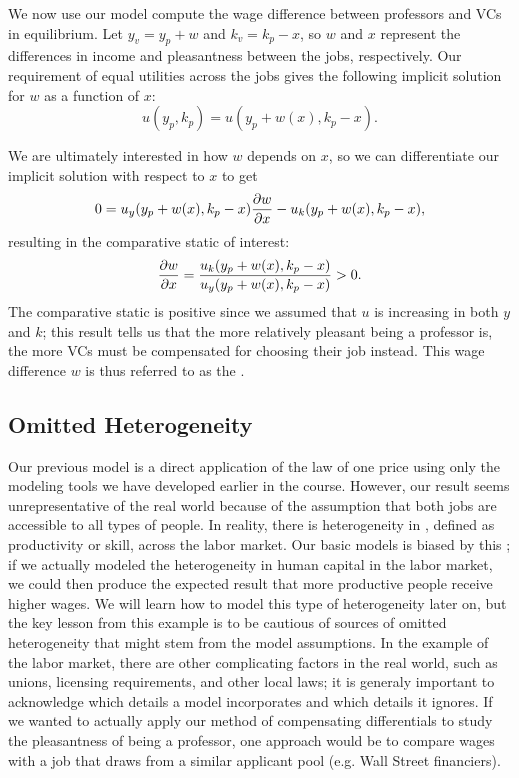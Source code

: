 We now use our model compute the wage difference between professors and VCs in equilibrium. Let $y_v = y_p + w$ and $k_v = k_p - x$, so $w$ and $x$ represent the differences in income and pleasantness between the jobs, respectively. Our requirement of equal utilities across the jobs gives the following implicit solution for $w$ as a function of $x$:
$$u(y_p, k_p) = u(y_p + w(x), k_p - x).$$

We are ultimately interested in how $w$ depends on $x$, so we can differentiate our implicit solution with respect to $x$ to get 
$$0 = u_y(y_p + w(x), k_p - x)\pdv{w}{x} - u_k(y_p + w(x), k_p - x),$$
resulting in the comparative static of interest:
$$\pdv{w}{x} = \frac{u_k(y_p + w(x), k_p - x)}{u_y(y_p + w(x), k_p - x)} > 0.$$
The comparative static is positive since we assumed that $u$ is increasing in both $y$ and $k$; this result tells us that the more relatively pleasant being a professor is, the more VCs must be compensated for choosing their job instead. This wage difference $w$ is thus referred to as the .


\subsection*{Omitted Heterogeneity} 
Our previous model is a direct application of the law of one price using only the modeling tools we have developed earlier in the course. However, our result seems unrepresentative of the real world because of the assumption that both jobs are accessible to all types of people. In reality, there is heterogeneity in , defined as productivity or skill, across the labor market. Our basic models is biased by this ; if we actually modeled the heterogeneity in human capital in the labor market, we could then produce the expected result that more productive people receive higher wages. We will learn how to model this type of heterogeneity later on, but the key lesson from this example is to be cautious of sources of omitted heterogeneity that might stem from the model assumptions. In the example of the labor market, there are other complicating factors in the real world, such as unions, licensing requirements, and other local laws; it is generaly important to acknowledge which details a model incorporates and which details it ignores. If we wanted to actually apply our method of compensating differentials to study the pleasantness of being a professor, one approach would be to compare wages with a job that draws from a similar applicant pool (e.g. Wall Street financiers).

